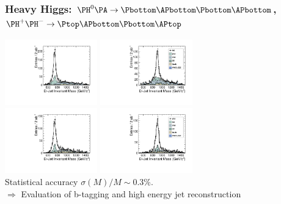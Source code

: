 \documentclass{beamer}
\begin{document}
\begin{frame}
\frametitle{Heavy Higgs: $\PH^0\PA\to\Pbottom\APbottom\Pbottom\APbottom$,
$\PH^+\PH^-\to\Ptop\APbottom\Pbottom\APtop$}
\centering
\includegraphics[width=4cm]{../SIDWorkshop/HAMass742_Bkg_CKFM_00BX_FJ.pdf}
\includegraphics[width=4cm]{../SIDWorkshop/HAMass902_Bkg_CKFM_00BX_FJ.pdf}\\
\includegraphics[width=4cm]{../SIDWorkshop/Hpm_Mass742_Bkg_CKFM_00BX_FJ.pdf}
\includegraphics[width=4cm]{../SIDWorkshop/Hpm_Mass902_Bkg_CKFM_00BX_FJ.pdf}\\
{\scriptsize Statistical accuracy $\sigma(M)/M \sim0.3\%$.}\\
$\Rightarrow$ Evaluation of \alert{b-tagging and high energy jet
reconstruction}
\end{frame}
\end{document}
